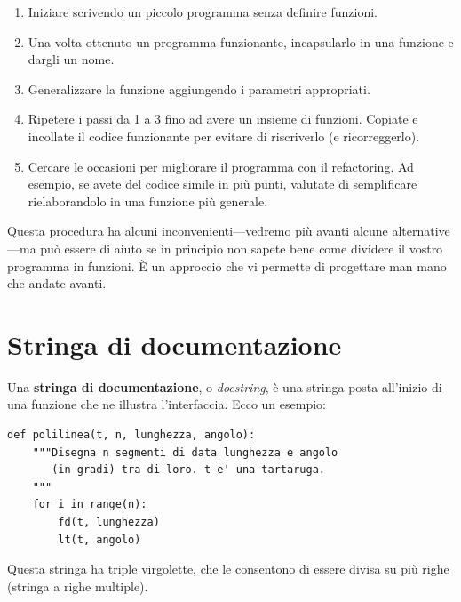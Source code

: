 \documentclass[10pt]{book}
\begin{document}
\begin{enumerate}

\item Iniziare scrivendo un piccolo programma senza definire funzioni.

\item Una volta ottenuto un programma funzionante, incapsularlo in una funzione e dargli un nome.

\item Generalizzare la funzione aggiungendo i parametri appropriati.

\item Ripetere i passi da 1 a 3 fino ad avere un insieme di funzioni. Copiate e incollate il codice funzionante per evitare di riscriverlo (e ricorreggerlo).

\item Cercare le occasioni per migliorare il programma con il refactoring. Ad esempio, se avete del codice simile in più punti, valutate di semplificare rielaborandolo in una funzione più generale.

\end{enumerate}

Questa procedura ha alcuni inconvenienti---vedremo più avanti alcune alternative---ma può essere di aiuto se in principio non sapete bene come dividere il vostro programma in funzioni. È un approccio che vi permette di progettare man mano che andate avanti.


\section{Stringa di documentazione}
\label{docstring}

Una {\bf stringa di documentazione}, o {\em docstring}, è una stringa posta all'inizio di una funzione che ne illustra l'interfaccia. Ecco un esempio:

\begin{verbatim}
def polilinea(t, n, lunghezza, angolo):
    """Disegna n segmenti di data lunghezza e angolo
       (in gradi) tra di loro. t e' una tartaruga.
    """    
    for i in range(n):
        fd(t, lunghezza)
        lt(t, angolo)
\end{verbatim}
%
Questa stringa ha triple virgolette, che le consentono di essere divisa su più righe (stringa a righe multiple).
\end{document}
